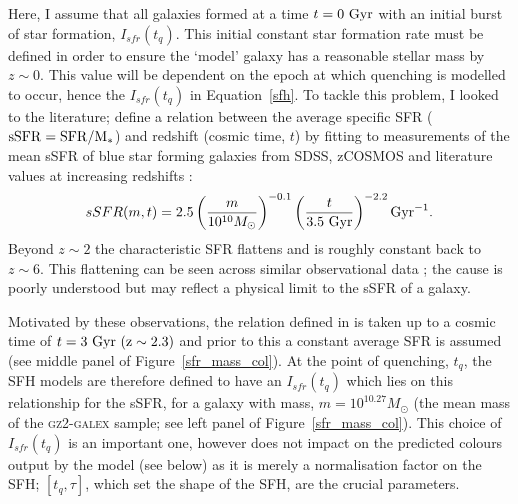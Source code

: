 Here, I assume that all galaxies formed at a time $t=0~\rm{Gyr}$ with an initial burst of star formation, $I_{sfr}(t_q)$. This initial constant star formation rate must be defined in order to ensure the `model' galaxy  has a reasonable stellar mass by $z\sim0$. This value will be dependent on the epoch at which quenching is modelled to occur, hence the $I_{sfr}(t_q)$ in Equation~\ref{sfh}. To tackle this problem, I looked to the literature; \citet[][Equation 1]{peng10} define a relation between the average specific SFR ($\rm{sSFR}=SFR/M_*$) and redshift (cosmic time, $t$) by fitting to measurements of the mean sSFR of blue star forming galaxies from SDSS, zCOSMOS and literature values at increasing redshifts \citep{Elbaz07, daddi07}:
\begin{equation}\label{eq:peng}
sSFR(m,t) = 2.5 \left( \frac{m}{10^{10} M_{\odot}} \right)^{-0.1} \left(\frac{t}{3.5 ~\rm{Gyr}}\right)^{-2.2} \rm{Gyr}^{-1}.
\end{equation}
Beyond $z \sim 2$ the characteristic SFR flattens and is roughly constant back to $z\sim6$. This flattening can be seen across similar observational data \citep{peng10, gonzalez10, bethermin12}; the cause is poorly understood but may reflect a physical limit to the sSFR of a galaxy. 

Motivated by these observations, the relation defined in \citet{peng10} is taken up to a cosmic time of $t=3~\rm{Gyr}~(z \sim 2.3)$ and prior to this a constant average SFR is assumed (see middle panel of Figure~\ref{sfr_mass_col}). At the point of quenching, $t_{q}$, the SFH models are therefore defined to have an $I_{sfr}(t_q)$ which lies on this relationship for the sSFR, for a galaxy with mass, $m = 10^{10.27} M_{\odot}$ (the mean mass of the \textsc{gz2-galex} sample; see left panel of Figure~\ref{sfr_mass_col}). This choice of $I_{sfr}(t_q)$ is an important one, however does not impact on the predicted colours output by the model (see below) as it is merely a normalisation factor on the SFH; $[t_q, \tau]$, which set the shape of the SFH, are the crucial parameters. 


